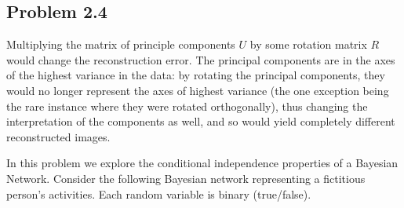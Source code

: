 \documentclass[submit]{harvardml}
\newcommand{\attr}[1]{\textsf{#1}}
\begin{document}
\subsection*{Problem 2.4}
Multiplying the matrix of principle components $U$ by some rotation matrix $R$ would change the reconstruction error. The principal components are in the axes of the highest variance in the data: by rotating the principal components, they would no longer represent the axes of highest variance (the one exception being the rare instance where they were rotated orthogonally), thus changing the interpretation of the components as well, and so would yield completely different reconstructed images.

\newpage

\begin{problem}

% 
% 

  
  \noindent In this problem we explore the conditional independence
  properties of a Bayesian Network.  Consider the following Bayesian
  network representing a fictitious person's activities. Each random
  variable is binary (true/false).

\begin{center}
\end{center}


\end{problem}
\end{document}
